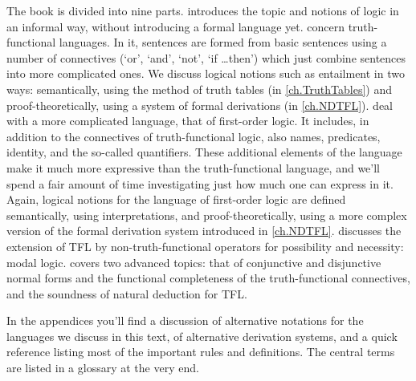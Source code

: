 The book is divided into nine parts.  introduces the topic and notions of logic in an informal way, without introducing a formal language yet.   concern truth-functional languages. In it, sentences are formed from basic sentences using a number of connectives (`or', `and', `not', `if \dots then') which just combine sentences into more complicated ones.  We discuss logical notions such as entailment in two ways: semantically, using the method of truth tables (in \cref{ch.TruthTables}) and proof-theoretically, using a system of formal derivations (in \cref{ch.NDTFL}).  deal with a more complicated language, that of first-order logic. It includes, in addition to the connectives of truth-functional logic, also names, predicates, identity, and the so-called quantifiers. These additional elements of the language make it much more expressive than the truth-functional language, and we'll spend a fair amount of time investigating just how much one can express in it.  Again, logical notions for the language of first-order logic are defined semantically, using interpretations, and proof-theoretically, using a more complex version of the formal derivation system introduced in \cref{ch.NDTFL}.   discusses the extension of TFL by non-truth-functional operators for possibility and necessity: modal logic.  covers two advanced topics: that of conjunctive and disjunctive normal forms and the functional completeness of the truth-functional connectives, and the soundness of natural deduction for TFL.

In the appendices you'll find a discussion of alternative notations for the languages we discuss in this text, of alternative derivation systems, and a quick reference listing most of the important rules and definitions. The central terms are listed in a glossary at the very end.

